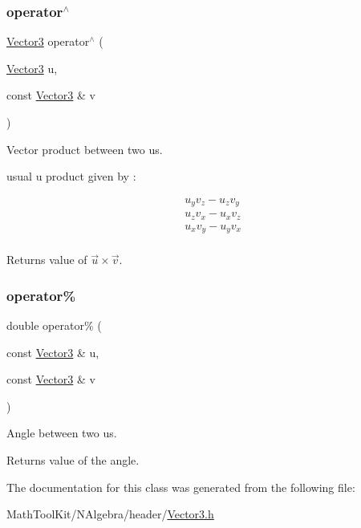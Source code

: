 \mbox{\label{class_vector3_adb4922062355e087babc81e8d5b7c05f}} 
\subsubsection{\texorpdfstring{operator$^\wedge$}{operator^}}
{\footnotesize\ttfamily \mbox{\hyperlink{class_vector3}{Vector3}} operator$^\wedge$ (\begin{DoxyParamCaption}\item[{\mbox{\hyperlink{class_vector3}{Vector3}}}]{u,  }\item[{const \mbox{\hyperlink{class_vector3}{Vector3}} \&}]{v }\end{DoxyParamCaption})\hspace{0.3cm}{\ttfamily [friend]}}



Vector product between two us. 

usual u product given by \+:

\[ \begin{align*} & u_y v_z - u_z v_y \\ & u_z v_x - u_x v_z \\ & u_x v_y - u_y v_x \\ \end{align*} \]

\begin{DoxyReturn}{Returns}
value of $ \vec{u} \times \vec{v} $. 
\end{DoxyReturn}
\mbox{\label{class_vector3_ab7427dc980f710e550fb4de32f0dfcbb}} 
\subsubsection{\texorpdfstring{operator\%}{operator\%}}
{\footnotesize\ttfamily double operator\% (\begin{DoxyParamCaption}\item[{const \mbox{\hyperlink{class_vector3}{Vector3}} \&}]{u,  }\item[{const \mbox{\hyperlink{class_vector3}{Vector3}} \&}]{v }\end{DoxyParamCaption})\hspace{0.3cm}{\ttfamily [friend]}}



Angle between two us. 

\begin{DoxyReturn}{Returns}
value of the angle. 
\end{DoxyReturn}


The documentation for this class was generated from the following file\+:\begin{DoxyCompactItemize}
\item 
Math\+Tool\+Kit/\+N\+Algebra/header/\mbox{\hyperlink{_vector3_8h}{Vector3.\+h}}\end{DoxyCompactItemize}
